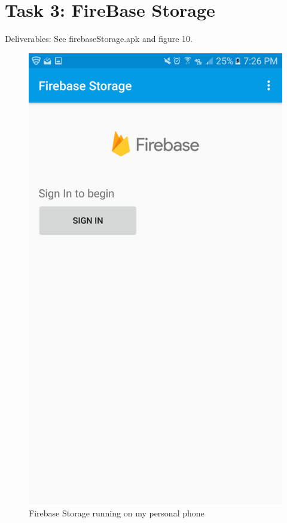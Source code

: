 \documentclass[10pt]{article}
\begin{document}
\section{Task 3: FireBase Storage}
Deliverables: See firebaseStorage.apk and figure 10.
\begin{figure}
\includegraphics[width=\linewidth]{img/firebaseStorage.png}
\caption{Firebase Storage running on my personal phone}
\end{figure}
\end{document}
